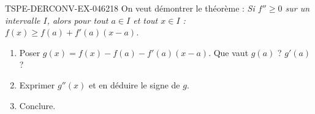 \begin{exercice}{TSPE-DERCONV-EX-046}{2}{18}
On veut démontrer le théorème : \emph{Si $f'' \geq 0$ sur un intervalle $I$, alors pour tout $a \in I$ et tout $x \in I$ : $f(x) \geq f(a) + f'(a)(x - a)$.}
\begin{enumerate}
  \item Poser $g(x) = f(x) - f(a) - f'(a)(x-a)$. Que vaut $g(a)$ ? $g'(a)$ ?
  \item Exprimer $g''(x)$ et en déduire le signe de $g$.
  \item Conclure.
\end{enumerate}

\end{exercice}
